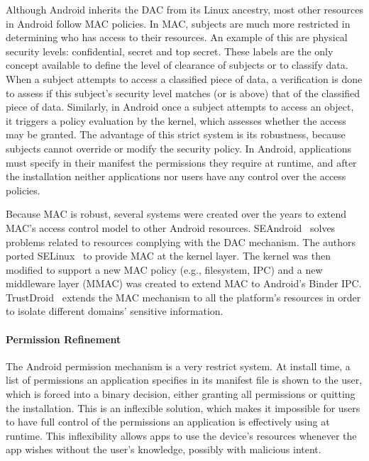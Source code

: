 Although Android inherits the \ac{DAC} from its Linux ancestry, most other resources in Android follow \ac{MAC} policies. In \ac{MAC}, subjects are much more restricted in determining who has access to their resources. An example of this are physical security levels: confidential, secret and top secret. These labels are the only concept available to define the level of clearance of subjects or to classify data. When a subject attempts to access a classified piece of data, a verification is done to assess if this subject's security level matches (or is above) that of the classified piece of data. Similarly, in Android once a subject attempts to access an object, it triggers a policy evaluation by the kernel, which assesses whether the access may be granted. The advantage of this strict system is its robustness, because subjects cannot override or modify the security policy. In Android, applications must specify in their manifest the permissions they require at runtime, and after the installation neither applications nor users have any control over the access policies.

Because \ac{MAC} is robust, several systems were created over the years to extend \ac{MAC}'s access control model to other Android resources. SEAndroid~\cite{smalley2013security} solves problems related to resources complying with the \ac{DAC} mechanism. The authors ported SELinux~\cite{peter2001integrating} to provide \ac{MAC} at the kernel layer. The kernel was then modified to support a new \ac{MAC} policy (e.g., filesystem, IPC) and a new middleware layer (MMAC) was created to extend \ac{MAC} to Android's Binder IPC. TrustDroid~\cite{bugiel2011practical} extends the \ac{MAC} mechanism to all the platform's resources in order to isolate different domains' sensitive information.

\paragraph{\textbf{Permission Refinement}} %

The Android permission mechanism is a very restrict system. At install time, a list of permissions an application specifies in its manifest file is shown to the user, which is forced into a binary decision, either granting all permissions or quitting the installation. This is an inflexible solution, which makes it impossible for users to have full control of the permissions an application is effectively using at runtime. This inflexibility allows apps to use the device's resources whenever the app wishes without the user's knowledge, possibly with malicious intent. 

